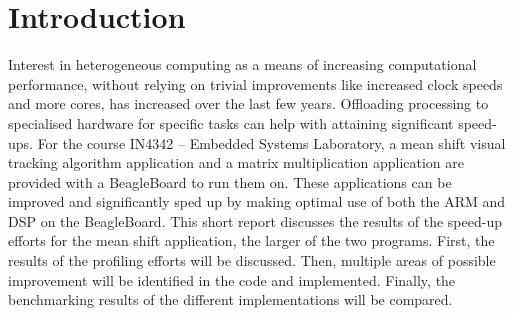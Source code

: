 \documentclass[final]{article}
\begin{document}
\section{Introduction}
Interest in heterogeneous computing as a means of increasing computational performance, without relying on trivial improvements like increased clock speeds and more cores, has increased over the last few years.
Offloading processing to specialised hardware for specific tasks can help with attaining significant speed-ups.
For the course IN4342 -- Embedded Systems Laboratory, a mean shift visual tracking algorithm application  and a matrix multiplication application are provided with a BeagleBoard to run them on.
These applications can be improved and significantly sped up by making optimal use of both the ARM and DSP on the BeagleBoard.
This short report discusses the results of the speed-up efforts for the mean shift application, the larger of the two programs.
First, the results of the profiling efforts will be discussed.
Then, multiple areas of possible improvement will be identified in the code and implemented.
Finally, the benchmarking results of the different implementations will be compared.
\end{document}
